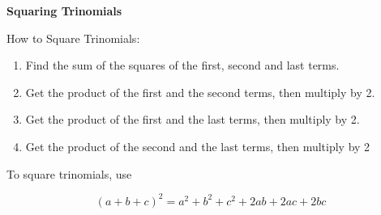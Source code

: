 \begin{center}
\textbf{Squaring Trinomials}
\end{center}

\vspce

How to Square Trinomials: 
\begin{enumerate}
\item	Find the sum of the squares of the first, second and last terms.  
\item	Get the product of the first and the second terms, then multiply by 2.
\item	Get the product of the first and the last terms, then multiply by 2.
\item	Get the product of the second and the last terms, then multiply by 2
\end{enumerate}

\vspce

To square trinomials, use

\vspce

$$(a + b + c)^{2} = a^{2} + b^{2} + c^{2} + 2ab + 2ac + 2bc$$

